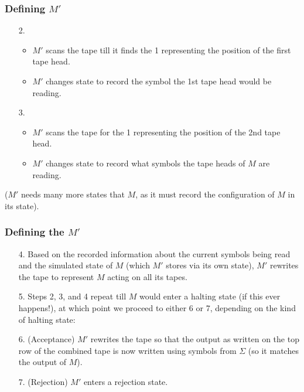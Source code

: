 \documentclass[handout]{beamer}
\begin{document}
\begin{frame}
\frametitle{Defining $M'$}
\begin{enumerate}
\item[2.] 
\begin{itemize}
\item $M'$ scans the tape till it finds the 1 representing the position of the first tape head. 
\vspace{0.1cm}
\item $M'$ changes state to record the symbol the 1st tape head would be reading. 
\vspace{0.3cm}
\end{itemize}
\item[3.] 
\begin{itemize}
\item $M'$ scans the tape for the 1 representing the position of the 2nd tape head.
\vspace{0.1cm}
\item $M'$ changes state to record what symbols the tape heads of $M$ are reading.
\end{itemize} 
\vspace{0.1cm}
\end{enumerate} 
($M'$ needs many more states that $M$, as it must record the configuration of $M$ in its state). 
\end{frame}

\begin{frame}
\frametitle{Defining the $M'$}
\begin{enumerate}

\item[4.] Based on the recorded information about the current symbols being read and the simulated state of $M$ (which $M'$ stores via its own state), $M'$ rewrites the tape to represent $M$ acting on all its tapes.
\vspace{0.2cm}
\item[5.] Steps 2, 3, and 4 repeat till $M$ would enter a halting state (if this ever happens!), at which point we proceed to either 6 or 7, depending on the kind of halting state:
\vspace{0.2cm}
\item[6.] (Acceptance) $M'$ rewrites the tape so that the output as written on the top row of the combined tape is now written using symbols from $\Sigma$ (so it matches the output of $M$). 
\vspace{0.2cm}
\item[7.] (Rejection) $M'$ enters a rejection state.
\end{enumerate} 
\end{frame}
\end{document}
